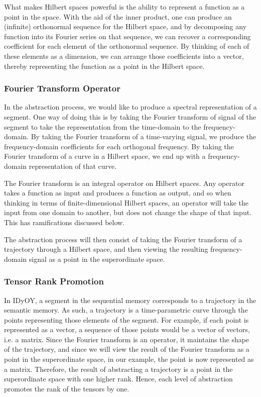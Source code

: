 \documentclass[runningheads]{llncs}
\begin{document}
What makes Hilbert spaces powerful is the ability to represent a function as a point in the space.  With the aid of the inner product, one can produce an (infinite) orthonormal sequence for the Hilbert space, and by decomposing any function into its Fourier series on that sequence, we can recover a corresponding coefficient for each element of the orthonormal sequence.  By thinking of each of these elements as a dimension, we can arrange those coefficients into a vector, thereby representing the function as a point in the Hilbert space.


\subsubsection{Fourier Transform Operator}
In the abstraction process, we would like to produce a spectral representation of a segment.  One way of doing this is by taking the Fourier transform of signal of the segment to take the representation from the time-domain to the frequency-domain.  By taking the Fourier transform of a time-varying signal, we produce the frequency-domain coefficients for each orthogonal frequency.  By taking the Fourier transform of a curve in a Hilbert space, we end up with a frequency-domain representation of that curve.

The Fourier transform is an integral operator on Hilbert spaces.  Any operator takes a function as input and produces a function as output, and so when thinking in terms of finite-dimensional Hilbert spaces, an operator will take the input from one domain to another, but does not change the shape of that input.  This has ramifications discussed below.

The abstraction process will then consist of taking the Fourier transform of a trajectory through a Hilbert space, and then viewing the resulting frequency-domain signal as a point in the superordinate space.


\subsubsection{Tensor Rank Promotion}

In IDyOY, a segment in the sequential memory corresponds to a trajectory in the semantic memory.  As such, a trajectory is a time-parametric curve through the points representing those elements of the segment.  For example, if each point is represented as a vector, a sequence of those points would be a vector of vectors, i.e. a matrix.  Since the Fourier transform is an operator, it maintains the shape of the trajectory, and since we will view the result of the Fourier transform as a point in the superordinate space, in our example, the point is now represented as a matrix.  Therefore, the result of abstracting a trajectory is a point in the superordinate space with one higher rank.  Hence, each level of abstraction promotes the rank of the tensors by one.  
\end{document}
